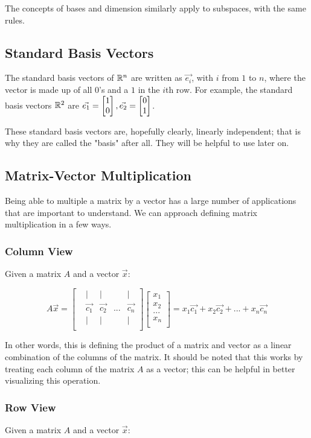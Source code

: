 \documentclass[12pt]{article}
\begin{document}
The concepts of bases and dimension similarly apply to subspaces, with the same rules.

\subsection{Standard Basis Vectors}
The standard basis vectors of $\mathbb{R}^n$ are written as $\Vec{e_i}$, with $i$ from $1$ to $n$, where the vector is made up of all 0's and a $1$ in the $i$th row. For example, the standard basis vectors $\mathbb{R}^2$ are $\Vec{e_1} = \begin{bmatrix} 1\\ 0\\ \end{bmatrix}, \Vec{e_2} = \begin{bmatrix} 0\\ 1\\ \end{bmatrix}$.

These standard basis vectors are, hopefully clearly, linearly independent; that is why they are called the "basis" after all. They will be helpful to use later on.

\subsection{Matrix-Vector Multiplication}
Being able to multiple a matrix by a vector has a large number of applications that are important to understand. We can approach defining matrix multiplication in a few ways.

\subsubsection{Column View}
Given a matrix $A$ and a vector $\Vec{x}$:

\[
A\Vec{x} = \begin{bmatrix}
&| &| & &|\\
&\Vec{c_1} &\Vec{c_2} &... &\Vec{c_n}\\
&| &| & &|\\
\end{bmatrix}\begin{bmatrix}
x_1\\
x_2\\
...\\
x_n\\
\end{bmatrix}=x_1 \Vec{c_1} + x_2 \Vec{c_2} + ... + x_n \Vec{c_n}
\]
 
In other words, this is defining the product of a matrix and vector as a linear combination of the columns of the matrix. It should be noted that this works by treating each column of the matrix $A$ as a vector; this can be helpful in better visualizing this operation.

\subsubsection{Row View}
Given a matrix $A$ and a vector $\Vec{x}$:
\end{document}
